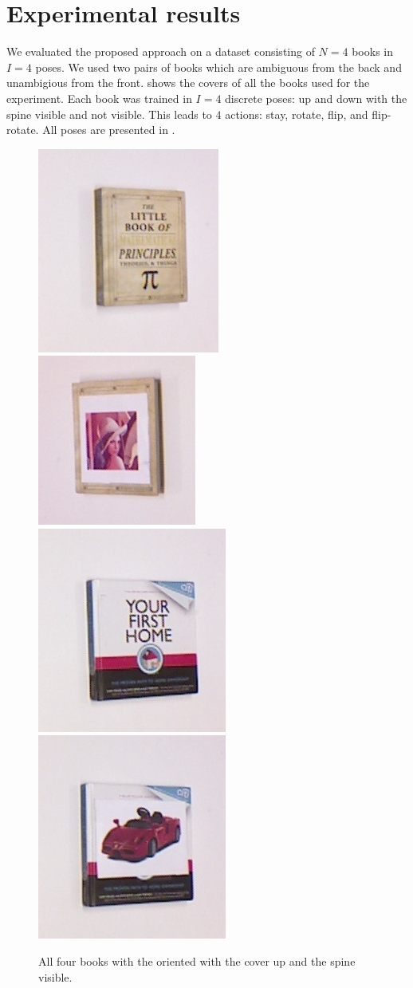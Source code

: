 \section{Experimental results}

    We evaluated the proposed approach on a dataset consisting of $N = 4$ books in $I = 4$ poses. We used two pairs of books which are ambiguous from the back and unambigious from the front.  shows the covers of all the books used for the experiment. Each book was trained in $I = 4$ discrete poses: up and down with the spine visible and not visible. This leads to $4$ actions: stay, rotate, flip, and flip-rotate. All poses are presented in . 
    
    \begin{figure}[h]
        \centering
        \includegraphics[width = 0.2\columnwidth]{pics/math_cover1_ok.jpg}
        \includegraphics[width = 0.2\columnwidth]{pics/math_cover2_ok.jpg}
        \includegraphics[width = 0.2\columnwidth]{pics/first_cover1.jpg}
        \includegraphics[width = 0.2\columnwidth]{pics/first_cover2.jpg}
        \caption{All four books with the oriented with the cover up and the spine visible.}
        \label{fig:object_dataset} %
    \end{figure}

